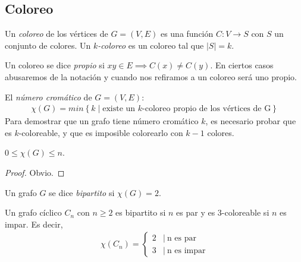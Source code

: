 \subsection{Coloreo}

\begin{definition}
  Un \emph{coloreo} de los vértices de $G = (V,E)$ es una función
  $C \colon V \to S$ con $S$ un conjunto de colores. Un \emph{$k$-coloreo} es
  un coloreo tal que $|S| = k$.
\end{definition}

\begin{definition}
  Un coloreo se dice \emph{propio} si $xy \in E \implies C(x) \neq C(y)$.
  En ciertos casos abusaremos de la notación y cuando nos refiramos a un
  coloreo será uno propio.
\end{definition}

\begin{definition}
  El \emph{número cromático} de $G = (V,E)$:
  \begin{align}
    \chi(G) = min\left\{k \mid \text{existe un $k$-coloreo propio de los
      vértices de G}\right\}
  \end{align}
  Para demostrar que un grafo tiene número cromático $k$, es necesario
  probar que es $k$-coloreable, y que es imposible colorearlo con $k-1$ colores.
\end{definition}

\begin{proposition}
  $0 \le \chi(G) \le n$.
\end{proposition}
\begin{proof}
  Obvio.
\end{proof}

\begin{definition}
  Un grafo $G$ se dice \emph{bipartito} si $\chi(G) = 2$.
\end{definition}

\begin{proposition}\label{graph_cyclic_color}
  Un grafo cíclico $C_n$ con $n \ge 2$ es bipartito si $n$ es par y es
  $3$-coloreable si $n$ es impar. Es decir,
  \begin{align}
    \chi(C_n) = 
    \begin{cases}
      2 & |\ \text{n es par} \\
      3 & |\ \text{n es impar}
    \end{cases}
  \end{align}
\end{proposition}


